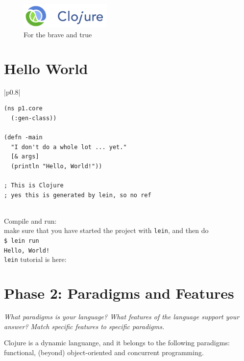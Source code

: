 \documentclass[12pt]{article}
\begin{document}
\tableofcontents




\begin{figure}[] 
\centering
\includegraphics[width = 0.4\textwidth]{c}
\caption{For the brave and true}
\label{fig:my_label}
\end{figure}




\section{Hello World}
\noindent
\begin{tabular}{|p{}|}
\hline
\begin{verbatim}
(ns p1.core
  (:gen-class))

(defn -main
  "I don't do a whole lot ... yet."
  [& args]
  (println "Hello, World!"))

; This is Clojure
; yes this is generated by lein, so no ref
\end{verbatim}
\\
\hline
Compile and run: \\make sure that you have started the project with \texttt{lein}, and then do\\
\texttt{\$ lein run}\\
\texttt{Hello, World!}\\
\hline
\texttt{lein} tutorial is here: \cite{1_github_2015}\\
\hline
\end{tabular}




\section{Phase 2: Paradigms and Features}


{\it What paradigms is your language? What features of the language support your answer? Match specific features to specific paradigms. }

\vspace{10pt}

Clojure is a dynamic languange, and it belongs to the following paradigms: functional, (beyond) object-oriented and concurrent programming.
\end{document}
